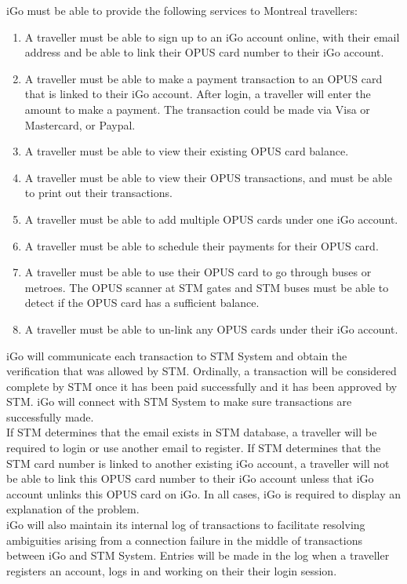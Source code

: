 \documentclass[11pt, english]{article}
\begin{document}
iGo must be able to provide the following services to Montreal travellers:
\begin{enumerate}
  \item A traveller must be able to sign up to an iGo account online, with their email address and be able to link their OPUS card number to their iGo account.
  \item A traveller must be able to make a payment transaction to an OPUS card that is linked to their iGo account. After login, a traveller will enter the amount to make a payment. The transaction could be made via Visa or Mastercard, or Paypal. 
  \item A traveller must be able to view their existing OPUS card balance. 
  \item A traveller must be able to view their OPUS transactions, and must be able to print out their transactions.
  \item A traveller must be able to add multiple OPUS cards under one iGo account.
  \item A traveller must be able to schedule their payments for their OPUS card. 
  \item A traveller must be able to use their OPUS card to go through buses or metroes. The OPUS scanner at STM gates and STM buses must be able to detect if the OPUS card has a sufficient balance.
  \item A traveller must be able to un-link any OPUS cards under their iGo account.
  
\end{enumerate}
iGo will communicate each transaction to STM System and obtain the verification that was allowed by STM. Ordinally, a transaction will be considered complete by STM once it has been paid successfully and it has been approved by STM. iGo will connect with STM System to make sure transactions are successfully made.\\

If  STM determines that the email exists in STM database, a traveller will be required to login or use another email to register. If STM determines that the STM card number is linked to another existing iGo account, a traveller will not be able to link this OPUS card number to their iGo account unless that iGo account unlinks this OPUS card on iGo. In all cases, iGo is required to display an explanation of the problem. \\

iGo will also maintain its internal log of transactions to facilitate resolving ambiguities arising from a connection failure in the middle of transactions between iGo and STM System. Entries will be made in the log when a traveller registers an account, logs in and  working on their their login session. \\
\end{document}
